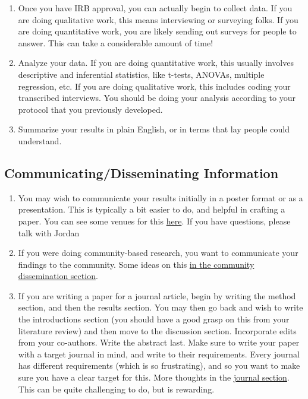 \documentclass[
]{book}
\begin{document}
\begin{enumerate}
\def\labelenumi{\arabic{enumi}.}
\setcounter{enumi}{6}
\item
  Once you have IRB approval, you can actually begin to collect data. If you are doing qualitative work, this means interviewing or surveying folks. If you are doing quantitative work, you are likely sending out surveys for people to answer. This can take a considerable amount of time!
\item
  Analyze your data. If you are doing quantitative work, this usually involves descriptive and inferential statistics, like t-tests, ANOVAs, multiple regression, etc. If you are doing qualitative work, this includes coding your transcribed interviews. You should be doing your analysis according to your protocol that you previously developed.
\item
  Summarize your results in plain English, or in terms that lay people could understand.
\end{enumerate}

\hypertarget{communicatingdisseminating-information}{%
\subsection{Communicating/Disseminating Information}\label{communicatingdisseminating-information}}

\begin{enumerate}
\def\labelenumi{\arabic{enumi}.}
\setcounter{enumi}{9}
\item
  You may wish to communicate your results initially in a poster format or as a presentation. This is typically a bit easier to do, and helpful in crafting a paper. You can see some venues for this \protect\hyperlink{presentations}{here}. If you have questions, please talk with Jordan
\item
  If you were doing community-based research, you want to communicate your findings to the community. Some ideas on this \protect\hyperlink{community}{in the community dissemination section}.
\item
  If you are writing a paper for a journal article, begin by writing the method section, and then the results section. You may then go back and wish to write the introductions section (you should have a good grasp on this from your literature review) and then move to the discussion section. Incorporate edits from your co-authors. Write the abstract last. Make sure to write your paper with a target journal in mind, and write to their requirements. Every journal has different requirements (which is so frustrating), and so you want to make sure you have a clear target for this. More thoughts in the \protect\hyperlink{journals}{journal section}. This can be quite challenging to do, but is rewarding.
\end{enumerate}
\end{document}

